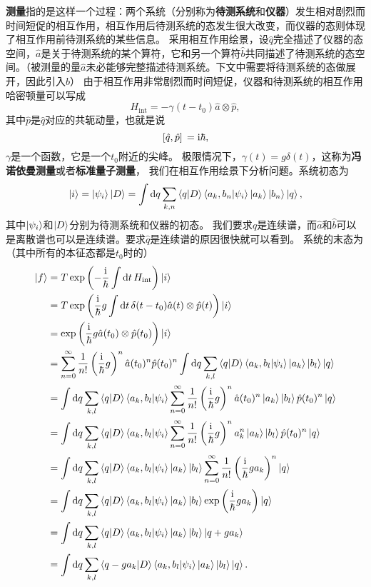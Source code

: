 \documentclass[hyperref, UTF8, a4paper]{ctexart}
\newcommand*{\ii}{\mathrm{i}}
\begin{document}
\textbf{测量}指的是这样一个过程：两个系统（分别称为\textbf{待测系统}和\textbf{仪器}）发生相对剧烈而时间短促的相互作用，相互作用后待测系统的态发生很大改变，而仪器的态则体现了相互作用前待测系统的某些信息。
采用相互作用绘景，设$\hat{q}$完全描述了仪器的态空间，$\hat{a}$是关于待测系统的某个算符，它和另一个算符$\hat{b}$共同描述了待测系统的态空间。（被测量的量$\hat{a}$未必能够完整描述待测系统。下文中需要将待测系统的态做展开，因此引入$\hat{b}$）
由于相互作用非常剧烈而时间短促，仪器和待测系统的相互作用哈密顿量可以写成
\begin{equation}
    H_\text{int} = - \gamma(t-t_0) \hat{a} \otimes \hat{p},
\end{equation}
其中$\hat{p}$是$\hat{q}$对应的共轭动量，也就是说
\[
    \comm*{\hat{q}}{\hat{p}} = \ii \hbar,
\]
$\gamma$是一个函数，它是一个$t_0$附近的尖峰。
极限情况下，$\gamma(t) = g \delta(t)$，这称为\textbf{冯诺依曼测量}或者\textbf{标准量子测量}，
我们在相互作用绘景下分析问题。系统初态为
\[
    \ket{i} = \ket{\psi_i} \ket{D} = \int \dd{q} \sum_{k, n} \braket{q}{D} \braket{a_k, b_n}{\psi_i} \ket{a_k} \ket{b_n} \ket{q},
\]
其中$\ket{\psi_i}$和$\ket{D}$分别为待测系统和仪器的初态。
我们要求$\hat{q}$是连续谱，而$\hat{a}$和$\hat{b}$可以是离散谱也可以是连续谱。要求$\hat{q}$是连续谱的原因很快就可以看到。
系统的末态为（其中所有的本征态都是$t_0$时的）
\[
    \begin{aligned}
        \ket{f} &= T \exp \left( - \frac{\ii}{\hbar} \int \dd{t} H_\text{int} \right) \ket{i} \\
        &= T \exp \left( \frac{\ii}{\hbar} g \int \dd{t} \delta(t-t_0) \hat{a}(t) \otimes \hat{p}(t) \right) \ket{i} \\
        &= \exp \left( \frac{\ii}{\hbar} g \hat{a}(t_0) \otimes \hat{p}(t_0) \right) \ket{i} \\
        &= \sum_{n=0}^\infty \frac{1}{n!} \left(\frac{\ii}{\hbar} g\right)^n \hat{a}(t_0)^n \hat{p}(t_0)^n \int \dd{q} \sum_{k, l} \braket{q}{D} \braket{a_k, b_l}{\psi_i} \ket{a_k} \ket{b_l} \ket{q} \\
        &= \int \dd{q} \sum_{k, l} \braket{q}{D} \braket{a_k, b_l}{\psi_i} \sum_{n=0}^\infty \frac{1}{n!} \left(\frac{\ii}{\hbar} g\right)^n \hat{a}(t_0)^n \ket{a_k} \ket{b_l} \hat{p}(t_0)^n \ket{q} \\
        &= \int \dd{q} \sum_{k, l} \braket{q}{D} \braket{a_k, b_l}{\psi_i} \sum_{n=0}^\infty \frac{1}{n!} \left(\frac{\ii}{\hbar} g\right)^n a_k^n \ket{a_k} \ket{b_l} \hat{p}(t_0)^n \ket{q} \\
        &= \int \dd{q} \sum_{k, l} \braket{q}{D} \braket{a_k, b_l}{\psi_i} \ket{a_k} \ket{b_l} \sum_{n=0}^\infty \frac{1}{n!} \left(\frac{\ii}{\hbar} g a_k \right)^n \ket{q} \\
        &= \int \dd{q} \sum_{k, l} \braket{q}{D} \braket{a_k, b_l}{\psi_i} \ket{a_k} \ket{b_l} \exp \left( \frac{\ii}{\hbar} g a_k \right) \ket{q} \\
        &= \int \dd{q} \sum_{k, l} \braket{q}{D} \braket{a_k, b_l}{\psi_i} \ket{a_k} \ket{b_l} \ket{q + g a_k} \\
        &= \int \dd{q} \sum_{k, l} \braket{q - g a_k}{D} \braket{a_k, b_l}{\psi_i} \ket{a_k} \ket{b_l} \ket{q} .
    \end{aligned}
\]
\end{document}
